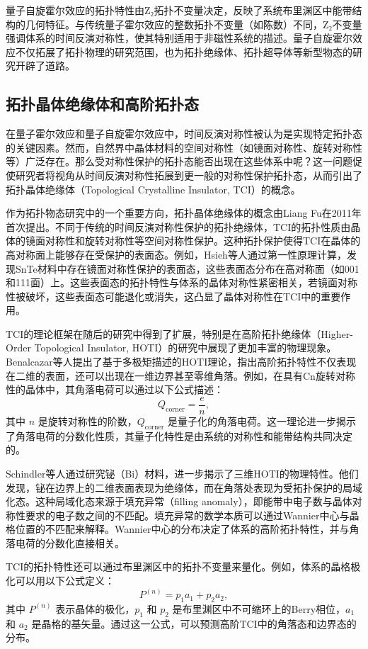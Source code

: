 量子自旋霍尔效应的拓扑特性由Z₂拓扑不变量决定，反映了系统布里渊区中能带结构的几何特征。与传统量子霍尔效应的整数拓扑不变量（如陈数）不同，Z₂不变量强调体系的时间反演对称性，使其特别适用于非磁性系统的描述。量子自旋霍尔效应不仅拓展了拓扑物理的研究范围，也为拓扑绝缘体、拓扑超导体等新型物态的研究开辟了道路。


\subsection{拓扑晶体绝缘体和高阶拓扑态}
在量子霍尔效应和量子自旋霍尔效应中，时间反演对称性被认为是实现特定拓扑态的关键因素。然而，自然界中晶体材料的空间对称性（如镜面对称性、旋转对称性等）广泛存在。那么受对称性保护的拓扑态能否出现在这些体系中呢？这一问题促使研究者将视角从时间反演对称性拓展到更一般的对称性保护拓扑态，从而引出了拓扑晶体绝缘体（Topological Crystalline Insulator, TCI）的概念。

作为拓扑物态研究中的一个重要方向，拓扑晶体绝缘体的概念由Liang Fu在2011年首次提出\cite{f1}。不同于传统的时间反演对称性保护的拓扑绝缘体，TCI的拓扑性质由晶体的镜面对称性和旋转对称性等空间对称性保护。这种拓扑保护使得TCI在晶体的高对称面上能够存在受保护的表面态。例如，Hsieh等人通过第一性原理计算，发现SnTe材料中存在镜面对称性保护的表面态，这些表面态分布在高对称面（如{001}和{111}面）上\cite{f2}。这些表面态的拓扑特性与体系的晶体对称性紧密相关，若镜面对称性被破坏，这些表面态可能退化或消失，这凸显了晶体对称性在TCI中的重要作用。

TCI的理论框架在随后的研究中得到了扩展，特别是在高阶拓扑绝缘体（Higher-Order Topological Insulator, HOTI）的研究中展现了更加丰富的物理现象\cite{f3}。Benalcazar等人提出了基于多极矩描述的HOTI理论，指出高阶拓扑特性不仅表现在二维的表面，还可以出现在一维边界甚至零维角落。例如，在具有Cn旋转对称性的晶体中，其角落电荷可以通过以下公式描述：
\[
Q_{\text{corner}} = \frac{e}{n},
\]
其中 \(n\) 是旋转对称性的阶数，\(Q_{\text{corner}}\) 是量子化的角落电荷。这一理论进一步揭示了角落电荷的分数化性质，其量子化特性是由系统的对称性和能带结构共同决定的。

Schindler等人通过研究铋（Bi）材料，进一步揭示了三维HOTI的物理特性\cite{f4}。他们发现，铋在边界上的二维表面表现为绝缘体，而在角落处表现为受拓扑保护的局域化态。这种局域化态来源于填充异常（filling anomaly），即能带中电子数与晶体对称性要求的电子数之间的不匹配。填充异常的数学本质可以通过Wannier中心与晶格位置的不匹配来解释。Wannier中心的分布决定了体系的高阶拓扑特性，并与角落电荷的分数化直接相关。

TCI的拓扑特性还可以通过布里渊区中的拓扑不变量来量化。例如，体系的晶格极化可以用以下公式定义：
\[
P^{(n)} = p_1 a_1 + p_2 a_2,
\]
其中 \(P^{(n)}\) 表示晶体的极化，\(p_1\) 和 \(p_2\) 是布里渊区中不可缩环上的Berry相位，\(a_1\) 和 \(a_2\) 是晶格的基矢量。通过这一公式，可以预测高阶TCI中的角落态和边界态的分布。


